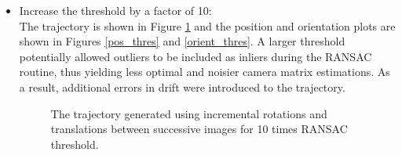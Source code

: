 \documentclass[12pt]{article} %
\begin{document}
\begin{enumerate}[label=\alph*)]
\begin{itemize}
\item Increase the threshold by a factor of 10:\\
The trajectory is shown in Figure \ref{traj_thres} and the position and orientation plots are shown in Figures \ref{pos_thres} and \ref{orient_thres}. A larger threshold potentially allowed outliers to be included as inliers during the RANSAC routine, thus yielding less optimal and noisier camera matrix estimations. As a result, additional errors in drift were introduced to the trajectory.

\begin{figure}[h!]
	\centering
	
	
	\caption{The trajectory generated using incremental rotations and translations between successive images for 10 times RANSAC threshold.}
	\label{traj_thres}
\end{figure}


\end{itemize}
\end{enumerate}
\end{document}
